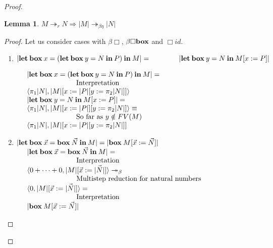 \documentclass[a4paper]{article}
\newtheorem{lemma}{Lemma}
\begin{document}
\begin{proof}
\begin{lemma}
    $M \twoheadrightarrow_{r} N \Rightarrow |M| \twoheadrightarrow_{\beta\eta} |N|$
  \end{lemma}

  \begin{proof}

    Let us consider cases with $\beta \Box$, $\beta \Box {\bf box}$ and $\Box id$.

\begin{enumerate}
\item $|{\bf let \: box \:} x = ({\bf let \: box \:} y = N {\: \bf in \:} P) {\: \bf in \:} M| = \\
\quad\quad\quad\quad |{\bf let \: box \:} y = N {\: \bf in \:} M [x := P]|$

  $\begin{array}{lll}
  &|{\bf let \: box \:} x = ({\bf let \: box \:} y = N {\: \bf in \:} P) {\: \bf in \:} M| = & \\
  &\quad\quad\quad\quad\quad\quad\quad \text{Interpretation}& \\
  &\langle \pi_1 |N|, |M| [x := |P| [y := \pi_2 |N|]] \rangle& \\
  &|{\bf let \: box \:} y = N {\: \bf in \:} M [x := P]| = & \\
  &\langle \pi_1 |N|, |M| [x := |P|] [y := \pi_2 |N|]\rangle \equiv & \\
  &\quad\quad\quad\quad\quad\quad\quad \text{So far as $y \notin FV(M)$} & \\
  &\langle \pi_1 |N|, |M| [x := |P| [y := \pi_2 |N|]]&
  \end{array}$

\item $|{\bf let \: box \:} \vec{x} = {\bf box \:} \vec{N} {\: \bf in \:} M| = |{\bf box \:} M [\vec{x} := \vec{N}]|$\\

  $\begin{array}{lll}
  &|{\bf let \: box \:} \vec{x} = {\bf box \:} \vec{N} {\: \bf in \:} M| = & \\
  &\quad\quad\quad\quad\quad\quad\quad \text{Interpretation}& \\
  &\langle 0 + \dots + 0, |M| [\vec{x} := \vec{|N|}]\rangle \twoheadrightarrow_{\beta}& \\
  &\quad\quad\quad\quad\quad\quad\quad \text{Multistep reduction for natural numbers}& \\
  &\langle 0, |M| [\vec{x} := \vec{|N|}] \rangle = & \\
  &\quad\quad\quad\quad\quad\quad\quad \text{Interpretation}& \\
  &|{\bf box \:} M [\vec{x} := \vec{N}]|&
  \end{array}$


\end{enumerate}
\end{proof}
\end{proof}
\end{document}
